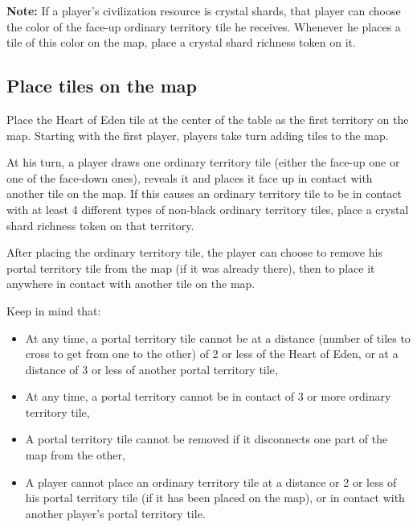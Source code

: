 \documentclass[a4paper]{article}
\begin{document}
        \textbf{Note:} If a player's civilization resource is crystal shards,
        that player can choose the color of the face-up ordinary territory tile
        he receives.
        Whenever he places a tile of this color on the map,
        place a crystal shard richness token on it.
      
    \subsection{Place tiles on the map}
        \label{map-tiles}
        Place the Heart of Eden tile at the center of the table as the first
        territory on the map.
        Starting with the first player, players take turn adding tiles to the map.
        
        At his turn, a player draws one ordinary territory tile
        (either the face-up one or one of the face-down ones),
        reveals it and places it face up in contact with another tile on the map.
        If this causes an ordinary territory tile to be in contact with at least
        4 different types of non-black ordinary territory tiles,
        place a crystal shard richness token on that territory.
        
        After placing the ordinary territory tile,
        the player can choose to remove his portal territory tile from the map
        (if it was already there),
        then to place it anywhere in contact with another tile on the map.
        
\newpage
        Keep in mind that:
        \vspace{-1.3em}
        \begin{itemize}
            \item At any time, a portal territory tile cannot be at a distance
                (number of tiles to cross to get from one to the other)
                of 2 or less of the Heart of Eden,
                or at a distance of 3 or less of another portal territory tile,
            \item At any time, a portal territory cannot be in contact of 3 or more
                ordinary territory tile,
            \item A portal territory tile cannot be removed
                if it disconnects one part of the map from the other,
            \item A player cannot place an ordinary territory tile at a distance
                or 2 or less of his portal territory tile (if it has been placed on the map),
                or in contact with another player's portal territory tile.
        \end{itemize}
        
\end{document}

